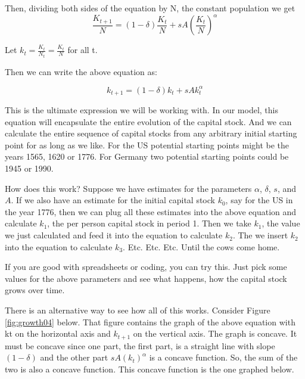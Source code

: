 \documentclass[
]{book}
\begin{document}
Then, dividing both sides of the equation by N, the constant population we get
\[\frac{K_{t+1}}{N}=(1-\delta)\frac{K_t}{N}+sA(\frac{K_t}{N})^\alpha\]

Let \(k_t=\frac{K_t}{N_t} = \frac{K_t}{N}\) for all t.

Then we can write the above equation as:

\[k_{t+1}=(1-\delta) k_t+s A k_t^α\]

This is the ultimate expression we will be working with. In our model, this equation will encapsulate the entire evolution of the capital stock. And we can calculate the entire sequence of capital stocks from any arbitrary initial starting point for as long as we like. For the US potential starting points might be the years 1565, 1620 or 1776. For Germany two potential starting points could be 1945 or 1990.

How does this work? Suppose we have estimates for the parameters \(\alpha\), \(\delta\), \(s\), and \(A\). If we also have an estimate for the initial capital stock \(k_0\), say for the US in the year 1776, then we can plug all these estimates into the above equation and calculate \(k_1\), the per person capital stock in period 1. Then we take \(k_1\), the value we just calculated and feed it into the equation to calculate \(k_2\). The we insert \(k_2\) into the equation to calculate \(k_3\).
Etc.
Etc.
Etc.
Until the cows come home.

If you are good with spreadsheets or coding, you can try this. Just pick some values for the above parameters and see what happens, how the capital stock grows over time.

There is an alternative way to see how all of this works. Consider Figure \ref{fig:growth04} below. That figure contains the graph of the above equation with kt on the horizontal axis and \(k_{t+1}\) on the vertical axis.
The graph is concave. It must be concave since one part, the first part, is a straight line with slope \((1 - \delta)\) and the other part \(sA(k_t)^\alpha\) is a concave function. So, the sum of the two is also a concave function. This concave function is the one graphed below.
\end{document}
